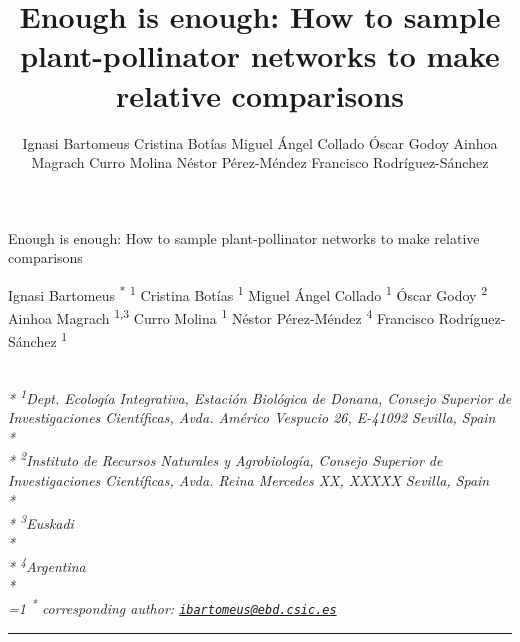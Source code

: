\documentclass[11pt,a4paper]{article}
\title{Enough is enough: How to sample plant-pollinator networks to make
relative comparisons}
\author{
Ignasi Bartomeus
Cristina Botías
Miguel Ángel Collado
Óscar Godoy
Ainhoa Magrach
Curro Molina
Néstor Pérez-Méndez
Francisco Rodríguez-Sánchez
}
\date{}
\begin{document}
\begin{singlespace}
\begin{center}
\huge Enough is enough: How to sample plant-pollinator networks to make
relative comparisons
\end{center}
\begin{center}
\large
Ignasi Bartomeus \textsuperscript{*} \textsuperscript{1} 
Cristina Botías \textsuperscript{1} 
Miguel Ángel Collado \textsuperscript{1} 
Óscar Godoy \textsuperscript{2} 
Ainhoa Magrach \textsuperscript{1,3} 
Curro Molina \textsuperscript{1} 
Néstor Pérez-Méndez \textsuperscript{4} 
Francisco Rodríguez-Sánchez \textsuperscript{1} 
\end{center}
\begin{justify}
\footnotesize \emph{ 
\\*
\textsuperscript{1}Dept. Ecología Integrativa, Estación Biológica de Donana, Consejo
Superior de Investigaciones Científicas, Avda. Américo Vespucio 26,
E-41092 Sevilla, Spain\\*
\\*
\textsuperscript{2}Instituto de Recursos Naturales y Agrobiología, Consejo Superior de
Investigaciones Científicas, Avda. Reina Mercedes XX, XXXXX Sevilla,
Spain\\*
\\*
\textsuperscript{3}Euskadi\\*
\\*
\textsuperscript{4}Argentina\\*
}
\setcounter{num}{1}
\\[0.1cm]
\footnotesize \emph{ 
\ifnum\value{num}=1%
\textsuperscript{*} corresponding author:
\fi
\href{mailto:ibartomeus@ebd.csic.es}{\nolinkurl{ibartomeus@ebd.csic.es}}
}
\end{justify}
\normalsize

\end{singlespace}


\singlespace

\vspace{2mm}

\hrule
\end{document}
